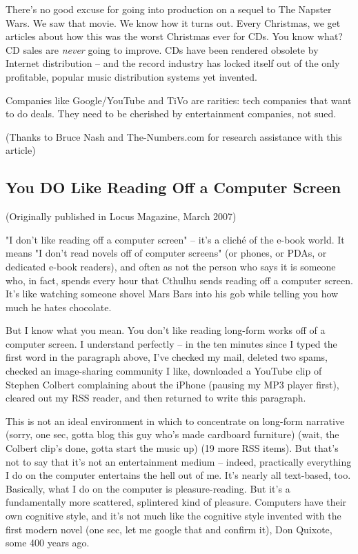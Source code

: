 There's no good excuse for going into production on a sequel to The
Napster Wars. We saw that movie. We know how it turns out. Every
Christmas, we get articles about how this was the worst Christmas
ever for CDs. You know what? CD sales are \emph{never} going to
improve. CDs have been rendered obsolete by Internet distribution
-- and the record industry has locked itself out of the only
profitable, popular music distribution systems yet invented.

Companies like Google/YouTube and TiVo are rarities: tech companies
that want to do deals. They need to be cherished by entertainment
companies, not sued.

(Thanks to Bruce Nash and The-Numbers.com for research assistance
with this article)

\subsection{You DO Like Reading Off a Computer Screen}

(Originally published in Locus Magazine, March 2007)

"I don't like reading off a computer screen" -- it's a cliché of
the e-book world. It means "I don't read novels off of computer
screens" (or phones, or PDAs, or dedicated e-book readers), and
often as not the person who says it is someone who, in fact, spends
every hour that Cthulhu sends reading off a computer screen. It's
like watching someone shovel Mars Bars into his gob while telling
you how much he hates chocolate.

But I know what you mean. You don't like reading long-form works
off of a computer screen. I understand perfectly -- in the ten
minutes since I typed the first word in the paragraph above, I've
checked my mail, deleted two spams, checked an image-sharing
community I like, downloaded a YouTube clip of Stephen Colbert
complaining about the iPhone (pausing my MP3 player first), cleared
out my RSS reader, and then returned to write this paragraph.

This is not an ideal environment in which to concentrate on
long-form narrative (sorry, one sec, gotta blog this guy who's made
cardboard furniture) (wait, the Colbert clip's done, gotta start
the music up) (19 more RSS items). But that's not to say that it's
not an entertainment medium -- indeed, practically everything I do
on the computer entertains the hell out of me. It's nearly all
text-based, too. Basically, what I do on the computer is
pleasure-reading. But it's a fundamentally more scattered,
splintered kind of pleasure. Computers have their own cognitive
style, and it's not much like the cognitive style invented with the
first modern novel (one sec, let me google that and confirm it),
Don Quixote, some 400 years ago.


